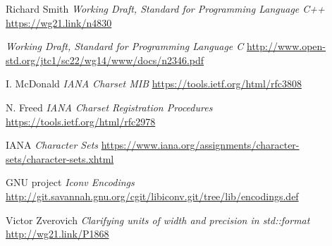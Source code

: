 \documentclass{wg21}
\begin{document}
\begin{thebibliography}{9}

Richard Smith
\emph{Working Draft, Standard for Programming Language C++}\newline
\url{https://wg21.link/n4830}


\emph{Working Draft, Standard for Programming Language C}\newline
\url{ http://www.open-std.org/jtc1/sc22/wg14/www/docs/n2346.pdf}


I. McDonald
\emph{IANA Charset MIB}\newline
\url{https://tools.ietf.org/html/rfc3808}

N. Freed
\emph{IANA Charset Registration Procedures}\newline
\url{https://tools.ietf.org/html/rfc2978}

IANA
\emph{Character Sets}\newline
\url{https://www.iana.org/assignments/character-sets/character-sets.xhtml}





GNU project
\emph{Iconv Encodings}\newline
\url{http://git.savannah.gnu.org/cgit/libiconv.git/tree/lib/encodings.def}

Victor Zverovich
\emph{Clarifying units of width and precision in std::format}\newline
\url{http://wg21.link/P1868}


\end{thebibliography}
\end{document}
